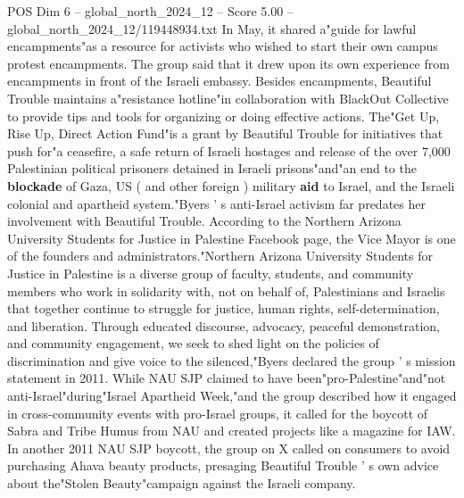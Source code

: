 \begin{textsample}{POS Dim 6 – global\_north\_2024\_12 – Score 5.00 – global\_north\_2024\_12/119448934.txt}
In May, it shared a"guide for lawful encampments"as a resource for activists who wished to start their own campus protest encampments.
The group said that it drew upon its own experience from encampments in front of the Israeli embassy.
Besides encampments, Beautiful Trouble maintains a"resistance hotline"in collaboration with BlackOut Collective to provide tips and tools for organizing or doing effective actions.
The"Get Up, Rise Up, Direct Action Fund"is a grant by Beautiful Trouble for initiatives that push for"a ceasefire, a safe return of Israeli hostages and release of the over 7,000 Palestinian political prisoners detained in Israeli prisons"and"an end to the \textbf{blockade} of Gaza, US ( and other foreign ) military \textbf{aid} to Israel, and the Israeli colonial and apartheid system."Byers ' s anti-Israel activism far predates her involvement with Beautiful Trouble.
According to the Northern Arizona University Students for Justice in Palestine Facebook page, the Vice Mayor is one of the founders and administrators."Northern Arizona University Students for Justice in Palestine is a diverse group of faculty, students, and community members who work in solidarity with, not on behalf of, Palestinians and Israelis that together continue to struggle for justice, human rights, self-determination, and liberation.
Through educated discourse, advocacy, peaceful demonstration, and community engagement, we seek to shed light on the policies of discrimination and give voice to the silenced,"Byers declared the group ' s mission statement in 2011.
While NAU SJP claimed to have been"pro-Palestine"and"not anti-Israel"during"Israel Apartheid Week,"and the group described how it engaged in cross-community events with pro-Israel groups, it called for the boycott of Sabra and Tribe Humus from NAU and created projects like a magazine for IAW.
In another 2011 NAU SJP boycott, the group on X called on consumers to avoid purchasing Ahava beauty products, presaging Beautiful Trouble ' s own advice about the"Stolen Beauty"campaign against the Israeli company.

\end{textsample}
